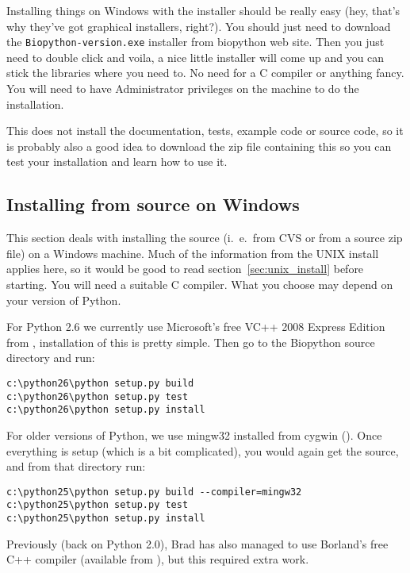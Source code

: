 \documentclass{article}
\begin{document}
Installing things on Windows with the installer should be really easy (hey, that's why they've got graphical installers, right?). You should just need to download the \verb|Biopython-version.exe| installer from biopython web site. Then you just need to double click and voila, a nice little installer will come up and you can stick the libraries where you need to. No need for a C compiler or anything fancy. You will need to have Administrator privileges on the machine to do the installation.

This does not install the documentation, tests, example code or source code, so it is probably also a good idea to download the zip file containing this so you can test your installation and learn how to use it.

\subsection{Installing from source on Windows}
\label{sec:windows_install}

This section deals with installing the source (i.~e.~from CVS or from a source zip file) on a Windows machine. Much of the information from the UNIX install applies here, so it would be good to read section~\ref{sec:unix_install} before starting.  You will need a suitable C compiler.
What you choose may depend on your version of Python.

For Python 2.6 we currently use Microsoft's free VC++ 2008 Express Edition from , installation of this is pretty simple.  Then go to the Biopython source directory and run:

\begin{verbatim}
c:\python26\python setup.py build
c:\python26\python setup.py test
c:\python26\python setup.py install
\end{verbatim}

For older versions of Python, we use mingw32 installed from cygwin ().  Once everything is setup (which is a bit complicated), you would again get the source, and from that directory run:

\begin{verbatim}
c:\python25\python setup.py build --compiler=mingw32
c:\python25\python setup.py test
c:\python25\python setup.py install
\end{verbatim}

Previously (back on Python 2.0), Brad has also managed to use Borland's free C++ compiler (available from ), but this required extra work.
\end{document}

